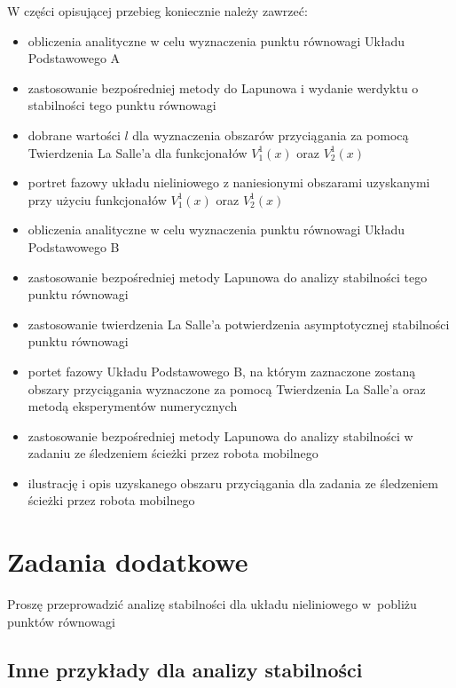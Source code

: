 \documentclass{sprawozdanie-agh}
\begin{document}
    W części opisującej przebieg koniecznie należy zawrzeć:
    \begin{itemize}
        \item obliczenia analityczne w celu wyznaczenia punktu równowagi Układu Podstawowego A
        \item zastosowanie bezpośredniej metody do Lapunowa i wydanie werdyktu o stabilności tego punktu równowagi
        \item dobrane wartości $l$ dla wyznaczenia obszarów przyciągania za pomocą Twierdzenia La Salle'a dla funkcjonałów $V_1^1(x)$ oraz $V_2^1(x)$
        \item portret fazowy układu nieliniowego z naniesionymi obszarami uzyskanymi przy użyciu funkcjonałów $V_1^1(x)$ oraz $V_2^1(x)$
        \item obliczenia analityczne w celu wyznaczenia punktu równowagi Układu Podstawowego B
        \item zastosowanie bezpośredniej metody Lapunowa do analizy stabilności tego punktu równowagi
        \item zastosowanie twierdzenia La Salle'a potwierdzenia asymptotycznej stabilności punktu równowagi
        \item portet fazowy Układu Podstawowego B, na którym zaznaczone zostaną obszary przyciągania wyznaczone za pomocą Twierdzenia La Salle'a oraz metodą eksperymentów numerycznych
        \item zastosowanie bezpośredniej metody Lapunowa do analizy stabilności w zadaniu ze śledzeniem ścieżki przez robota mobilnego
        \item ilustrację i opis uzyskanego obszaru przyciągania dla zadania ze śledzeniem ścieżki przez robota mobilnego
    \end{itemize}

    \section{Zadania dodatkowe}
        Proszę przeprowadzić analizę stabilności dla układu nieliniowego w~pobliżu punktów równowagi
    \subsection{Inne przykłady dla analizy stabilności}
    

\end{document}
